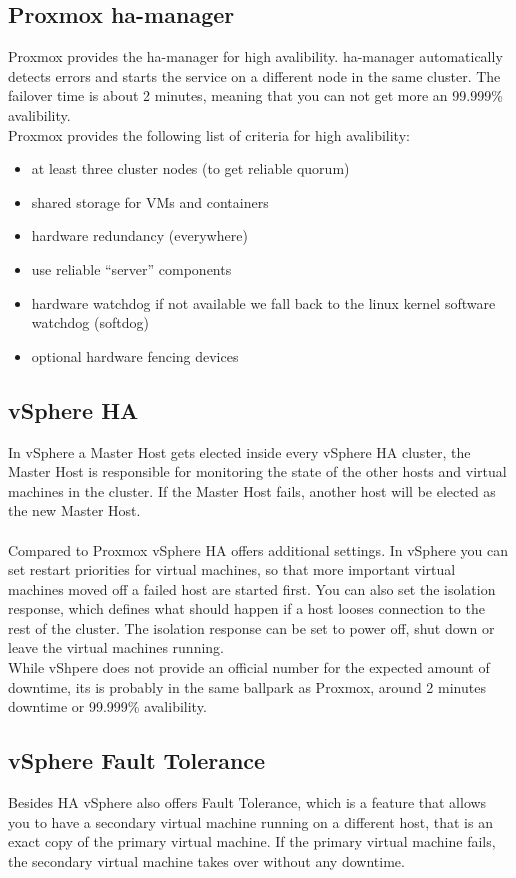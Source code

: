 \subsection{Proxmox ha-manager}
Proxmox provides the ha-manager for high avalibility. ha-manager automatically detects errors and starts the service on a different node in the same cluster. The failover time is about 2 minutes, meaning that you can not get more an 99.999\% avalibility.
\\
Proxmox provides the following list of criteria for high avalibility:

\begin{itemize}
    \item at least three cluster nodes (to get reliable quorum)
    \item shared storage for VMs and containers
    \item hardware redundancy (everywhere)
    \item use reliable “server” components
    \item hardware watchdog \- if not available we fall back to the linux kernel software watchdog (softdog)
    \item optional hardware fencing devices
\end{itemize}

\subsection{vSphere HA}
In vSphere a Master Host gets elected inside every vSphere HA cluster, the Master Host is responsible for monitoring the state of the other hosts and virtual machines in the cluster. If the Master Host fails, another host will be elected as the new Master Host.
\\\\
Compared to Proxmox vSphere HA offers additional settings. In vSphere you can set restart priorities for virtual machines, so that more important virtual machines moved off a failed host are started first. You can also set the isolation response, which defines what should happen if a host looses connection to the rest of the cluster. The isolation response can be set to power off, shut down or leave the virtual machines running.
\\
While vShpere does not provide an official number for the expected amount of downtime, its is probably in the same ballpark as Proxmox, around 2 minutes downtime or 99.999\% avalibility.

\subsection{vSphere Fault Tolerance}

Besides HA vSphere also offers Fault Tolerance, which is a feature that allows you to have a secondary virtual machine running on a different host, that is an exact copy of the primary virtual machine. If the primary virtual machine fails, the secondary virtual machine takes over without any downtime. 